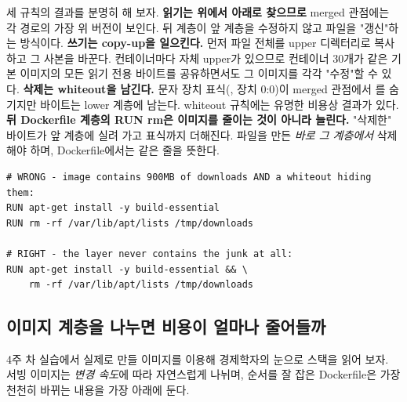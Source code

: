 세 규칙의 결과를 분명히 해 보자. \textbf{읽기는 위에서 아래로 찾으므로} merged 관점에는 각 경로의 가장 위 버전이 보인다. 뒤 계층이 앞 계층을 수정하지 않고 파일을 "갱신"하는 방식이다. \textbf{쓰기는 copy-up을 일으킨다.} 먼저 파일 전체를 upper 디렉터리로 복사하고 그 사본을 바꾼다. 컨테이너마다 자체 upper가 있으므로 컨테이너 30개가 같은 기본 이미지의 모든 읽기 전용 바이트를 공유하면서도 그 이미지를 각각 "수정"할 수 있다. \textbf{삭제는 whiteout을 남긴다.} 문자 장치 표식(, 장치 0:0)이 merged 관점에서 를 숨기지만 바이트는 lower 계층에 남는다. whiteout 규칙에는 유명한 비용상 결과가 있다. \textbf{뒤 Dockerfile 계층의 RUN rm은 이미지를 줄이는 것이 아니라 늘린다.} "삭제한" 바이트가 앞 계층에 실려 가고 표식까지 더해진다. 파일을 만든 \textit{바로 그 계층에서} 삭제해야 하며, Dockerfile에서는 같은  줄을 뜻한다.

\begin{terminalbox}
\begin{Verbatim}[breaklines=true,breakanywhere=true,fontsize=\small,formatcom=\color{tbbtermfg},codes=\tbbcodeactive]
# WRONG - image contains 900MB of downloads AND a whiteout hiding them:
RUN apt-get install -y build-essential
RUN rm -rf /var/lib/apt/lists /tmp/downloads

# RIGHT - the layer never contains the junk at all:
RUN apt-get install -y build-essential && \
    rm -rf /var/lib/apt/lists /tmp/downloads
\end{Verbatim}
\end{terminalbox}

\subsection*{이미지 계층을 나누면 비용이 얼마나 줄어들까}

4주 차 실습에서 실제로 만들 이미지를 이용해 경제학자의 눈으로 스택을 읽어 보자. 서빙 이미지는 \textit{변경 속도}에 따라 자연스럽게 나뉘며, 순서를 잘 잡은 Dockerfile은 가장 천천히 바뀌는 내용을 가장 아래에 둔다.

